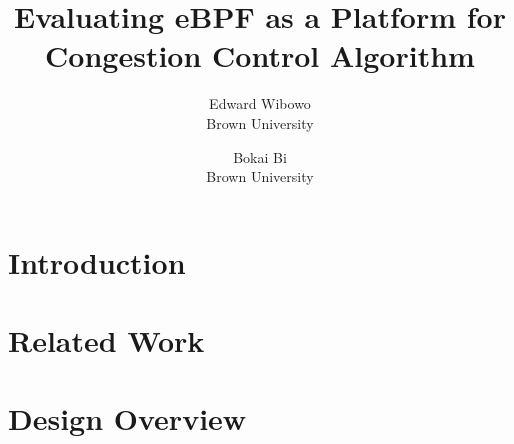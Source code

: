 

\date{}

\title{\Large \bf Evaluating eBPF as a Platform for Congestion Control Algorithm}

\author{
{\rm Edward Wibowo}\\
Brown University
\and
{\rm Bokai Bi}\\
Brown University
} %

\maketitle

\begin{abstract}

\end{abstract}


\section{Introduction}


\section{Related Work}


\section{Design Overview}


